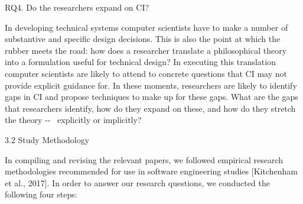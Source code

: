\documentclass[../thesis.tex]{subfiles}
\begin{document}
{\color[rgb]{0.2627451,0.2627451,0.2627451}
RQ4. Do the researchers expand on CI?}

In developing technical systems computer scientists have to make a
number of substantive and specific design decisions. This is also the
point at which the rubber meets the road: how does a researcher
translate a philosophical theory into a formulation useful for
technical design? In executing this translation computer scientists are
likely to attend to concrete questions that CI may not provide explicit
guidance for. In these moments, researchers are likely to identify gaps
in CI and propose techniques to make up for these gaps. What are the
gaps that researchers identify, how do they expand on these, and how do
they stretch the theory -{}- \ explicitly or implicitly?

3.2 Study Methodology

In compiling and revising the relevant papers, we followed empirical
research methodologies recommended for use in software engineering
studies [Kitchenham et al., 2017]. In order to answer our research
questions, we conducted the following four steps: 
\end{document}
